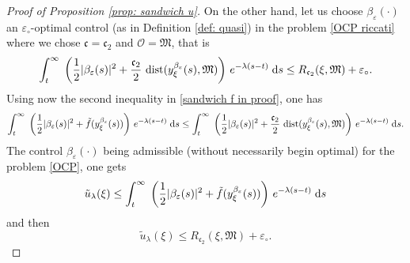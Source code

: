 \documentclass[12pt]{amsart}
\newcommand{\D}[1]{\mbox{\rm #1}}
\newcommand{\dd}{\D{d}}
\numberwithin{equation}{section}
\theoremstyle{plain}
\begin{document}
\begin{proof}[Proof of Proposition \ref{prop: sandwich u}]
On the other hand, let us choose $\beta_{\varepsilon}(\cdot)$ an  $\varepsilon_{\circ}$-optimal control (as in Definition \ref{def: quasi}) in the problem \eqref{OCP riccati} where we chose $\mathfrak{c}=\mathfrak{c}_{2}$ and $\mathscr{O}=\mathfrak{M}$, that is
\begin{equation*}
    \int_{t}^{\infty}\; \left(\frac{1}{2}|\beta_{\varepsilon}(s)|^{2} + \frac{\mathfrak{c}_{2}}{2}\,\operatorname{dist}(y_{\xi}^{\beta_{\varepsilon}}(s),\mathfrak{M})\right)\, e^{-\lambda (s-t)}\;\dd s \leq R_{\mathfrak{c}_{2}}(\xi, \mathfrak{M}) + \varepsilon_{\circ}.
\end{equation*}
Using now the second inequality in \eqref{sandwich f in proof}, one has
\begin{equation*}
    \int_{t}^{\infty}\; \left(\frac{1}{2}|\beta_{\varepsilon}(s)|^{2} + \tilde{f}(y_{\xi}^{\beta_{\varepsilon}}(s))\right)\, e^{-\lambda (s-t)}\;\dd s
    \leq 
    \int_{t}^{\infty}\; \left(\frac{1}{2}|\beta_{\varepsilon}(s)|^{2} + \frac{\mathfrak{c}_{2}}{2}\,\operatorname{dist}(y_{\xi}^{\beta_{\varepsilon}}(s),\mathfrak{M})\right)\, e^{-\lambda (s-t)}\;\dd s.
\end{equation*}
The control $\beta_{\varepsilon}(\cdot)$ being admissible (without necessarily begin optimal) for the problem \eqref{OCP}, one gets
\begin{equation*}
    \tilde{u}_{\lambda}(\xi)
    \leq 
    \int_{t}^{\infty}\; \left(\frac{1}{2}|\beta_{\varepsilon}(s)|^{2} + \tilde{f}(y_{\xi}^{\beta_{\varepsilon}}(s))\right)\, e^{-\lambda (s-t)}\;\dd s
\end{equation*}
and then
\begin{equation}\label{eq: up R}
    \tilde{u}_{\lambda}(\xi)
    \leq 
    R_{\mathfrak{c}_{2}}(\xi, \mathfrak{M}) + \varepsilon_{\circ}.
\end{equation}


\end{proof}
\end{document}

